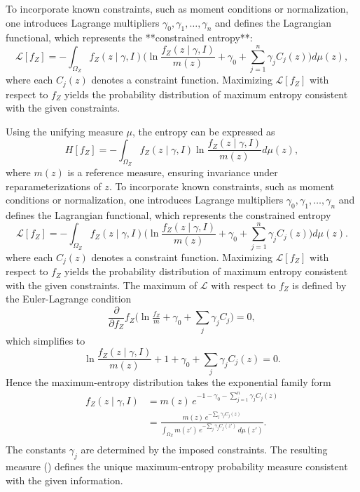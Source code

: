 To incorporate known constraints, such as moment conditions or normalization, one introduces Lagrange multipliers $\gamma_0, \gamma_1, \dots, \gamma_n$ and defines the Lagrangian functional, which represents the **constrained entropy**:
\begin{equation}
	\mathcal{L}[f_Z] = - \int_{\Omega_Z} 
	f_Z(z \mid \gamma, I) \Bigg(
	\ln \frac{f_Z(z \mid \gamma, I)}{m(z)}
	+ \gamma_0 + \sum_{j=1}^n \gamma_j C_j(z)
	\Bigg) d\mu(z),
\end{equation}
where each $C_j(z)$ denotes a constraint function. Maximizing $\mathcal{L}[f_Z]$ with respect to $f_Z$ yields the probability distribution of maximum entropy consistent with the given constraints.

Using the unifying measure $\mu$, the entropy can be expressed as
\begin{equation}
	H[f_Z] = - \int_{\Omega_Z} f_Z(z \mid \gamma, I) 
	\ln \frac{f_Z(z \mid \gamma, I)}{m(z)} d\mu(z),
\end{equation}
where $m(z)$ is a reference measure, ensuring invariance under reparameterizations of $z$. 
To incorporate known constraints, such as moment conditions or normalization, one introduces Lagrange multipliers $\gamma_0, \gamma_1, \dots, \gamma_n$ and defines the Lagrangian functional, which represents the constrained entropy
\begin{equation}
	\mathcal{L}[f_Z] =- \int_{\Omega_Z} 
	f_Z(z \mid \gamma, I)\Big(
	\ln \frac{f_Z(z \mid \gamma, I)}{m(z)}
	+ \gamma_0 + \sum_{j=1}^n \gamma_j C_j(z)
	\Big) d\mu(z).
\end{equation}
where each $C_j(z)$ denotes a constraint function. Maximizing $\mathcal{L}[f_Z]$ with respect to $f_Z$ yields the probability distribution of maximum entropy consistent with the given constraints. The maximum of $\mathcal{L}$ with respect to $f_Z$ is defined by the Euler-Lagrange condition
\begin{equation}
	\frac{\partial}{\partial f_Z} f_Z\Big(\ln \tfrac{f_Z}{m} + \gamma_0 + \sum_j \gamma_j C_j\Big) = 0,
\end{equation}
which simplifies to
\begin{equation}
	\ln \frac{f_Z(z \mid \gamma, I)}{m(z)} + 1 + \gamma_0 + \sum_j \gamma_j C_j(z) = 0.
\end{equation}
Hence the maximum-entropy distribution takes the exponential family form
\begin{equation}
	\begin{split}
		f_Z(z \mid \gamma, I)
		&= m(z)\, e^{-1 - \gamma_0 - \sum_{j=1}^n \gamma_j C_j(z)} \\
		&= \frac{m(z)\, e^{-\sum_j \gamma_j C_j(z)}}{
			\int_{\Omega_Z} m(z')\, e^{-\sum_j \gamma_j C_j(z')}\, d\mu(z')}.\\
	\end{split}
\end{equation}
The constants $\gamma_j$ are determined by the imposed constraints. The resulting measure () defines the unique maximum-entropy probability measure consistent with the given information.

